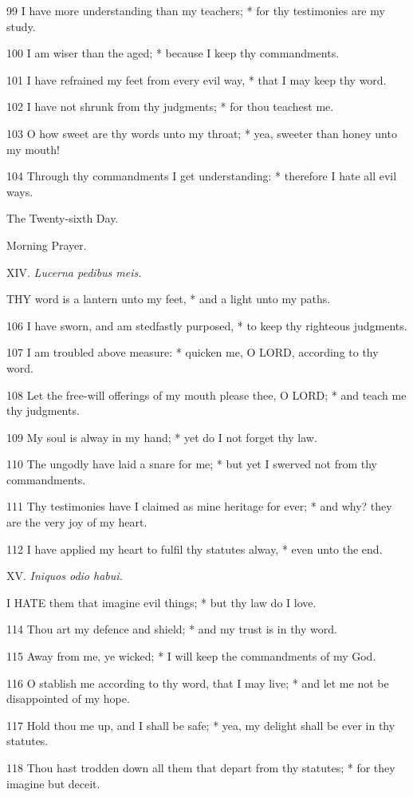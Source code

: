 99 I have more understanding than my teachers; * for
thy testimonies are my study.

100 I am wiser than the aged; * because I keep thy
commandments.

101 I have refrained my feet from every evil way, *
that I may keep thy word.

102 I have not shrunk from thy judgments; * for thou
teachest me.

103 O how sweet are thy words unto my throat; * yea,
sweeter than honey unto my mouth!

104 Through thy commandments I get understanding: *
therefore I hate all evil ways. 

The
Twenty-sixth Day.

Morning
Prayer.

XIV. \emph{Lucerna
pedibus meis.}

THY
word is a lantern unto my feet, * and a light unto my paths.

106 I have sworn, and am stedfastly purposed, * to
keep thy righteous judgments.

107 I am troubled above measure: * quicken me, O LORD,
according to thy word.

108 Let the free-will offerings of my mouth please
thee, O LORD; * and teach me thy judgments.

109 My soul is alway in my hand; * yet do I not forget
thy law.

110 The ungodly have laid a snare for me; * but yet
I swerved not from thy commandments.

111 Thy testimonies have I claimed as mine heritage
for ever; * and why? they are the very joy of my heart.

112 I have applied my heart to fulfil thy statutes
alway, * even unto the end.

XV. \emph{Iniquos
odio habui.}

I
HATE them that imagine evil things; * but thy law do I love.

114 Thou art my defence and shield; * and my trust
is in thy word.

115 Away from me, ye wicked; * I will keep the commandments
of my God.

116 O stablish me according to thy word, that I may
live; * and let me not be disappointed of my hope.

117 Hold thou me up, and I shall be safe; * yea, my
delight shall be ever in thy statutes.

118 Thou hast trodden down all them that depart from
thy statutes; * for they imagine but deceit.


